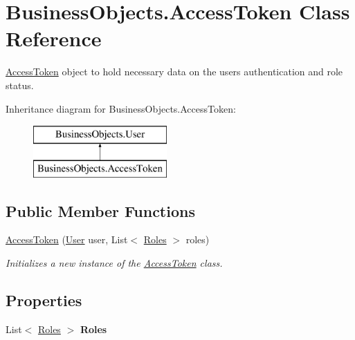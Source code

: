 \hypertarget{class_business_objects_1_1_access_token}{}\section{Business\+Objects.\+Access\+Token Class Reference}
\label{class_business_objects_1_1_access_token}


\hyperlink{class_business_objects_1_1_access_token}{Access\+Token} object to hold necessary data on the user\textquotesingle{}s authentication and role status.  


Inheritance diagram for Business\+Objects.\+Access\+Token\+:\begin{figure}[H]
\begin{center}
\leavevmode
\includegraphics[height=2.000000cm]{class_business_objects_1_1_access_token}
\end{center}
\end{figure}
\subsection*{Public Member Functions}
\begin{DoxyCompactItemize}
\item 
\hyperlink{class_business_objects_1_1_access_token_a0db5c344cbe742041a0200d686df4dfe}{Access\+Token} (\hyperlink{class_business_objects_1_1_user}{User} user, List$<$ \hyperlink{class_business_objects_1_1_roles}{Roles} $>$ roles)
\begin{DoxyCompactList}\small\item\em Initializes a new instance of the \hyperlink{class_business_objects_1_1_access_token}{Access\+Token} class. \end{DoxyCompactList}\end{DoxyCompactItemize}
\subsection*{Properties}
\begin{DoxyCompactItemize}
\item 
List$<$ \hyperlink{class_business_objects_1_1_roles}{Roles} $>$ {\bfseries Roles}\hypertarget{class_business_objects_1_1_access_token_a5d5c41760baf531cf54bc15680357c6c}{}\label{class_business_objects_1_1_access_token_a5d5c41760baf531cf54bc15680357c6c}

\end{DoxyCompactItemize}


